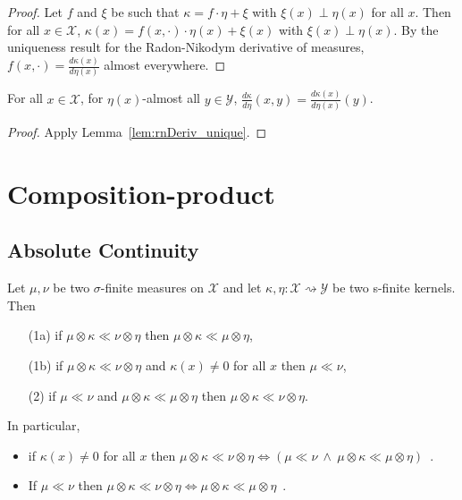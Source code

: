 \begin{proof} \leanok
Let $f$ and $\xi$ be such that $\kappa = f \cdot \eta + \xi$ with $\xi(x) \perp \eta(x)$ for all $x$. Then for all $x \in \mathcal X$, $\kappa(x) = f(x, \cdot) \cdot \eta(x) + \xi(x)$ with $\xi(x) \perp \eta(x)$. By the uniqueness result for the Radon-Nikodym derivative of measures, $f(x, \cdot) = \frac{d \kappa(x)}{d \eta(x)}$ almost everywhere.
\end{proof}


\begin{corollary}
  \label{cor:rnDeriv_value}
  \leanok
  For all $x \in \mathcal X$, for $\eta(x)$-almost all $y \in \mathcal Y$, $\frac{d \kappa}{d \eta}(x, y) = \frac{d \kappa(x)}{d \eta(x)}(y)$.
\end{corollary}

\begin{proof} \leanok
{}
Apply Lemma~\ref{lem:rnDeriv_unique}.
\end{proof}



\section{Composition-product}

\subsection{Absolute Continuity}

\begin{lemma}
  \label{lem:ac_compProd_iff}
  \leanok
  Let $\mu, \nu$ be two $\sigma$-finite measures on $\mathcal X$ and let $\kappa, \eta : \mathcal X \rightsquigarrow \mathcal Y$ be two s-finite kernels. Then
  \begin{itemize}
    \item[(1a)] if $\mu \otimes \kappa \ll \nu \otimes \eta$ then $\mu \otimes \kappa \ll \mu \otimes \eta$,
    \item[(1b)] if $\mu \otimes \kappa \ll \nu \otimes \eta$ and $\kappa(x) \ne 0$ for all $x$ then $\mu \ll \nu$,
    \item[(2)]  if $\mu \ll \nu$ and $\mu \otimes \kappa \ll \mu \otimes \eta$ then $\mu \otimes \kappa \ll \nu \otimes \eta$.
  \end{itemize}
  In particular,
  \begin{itemize}
    \item if $\kappa(x) \ne 0$ for all $x$ then
      $\mu \otimes \kappa \ll \nu \otimes \eta \iff \left( \mu \ll \nu \ \wedge \ \mu \otimes \kappa \ll \mu \otimes \eta \right)$~.
    \item If $\mu \ll \nu$ then $\mu \otimes \kappa \ll \nu \otimes \eta \iff \mu \otimes \kappa \ll \mu \otimes \eta$~.
  \end{itemize}
  
\end{lemma}

